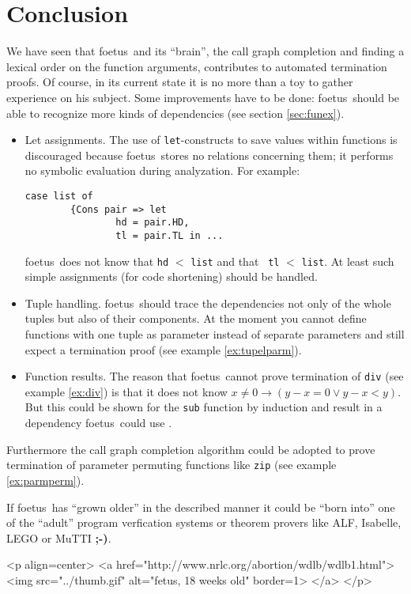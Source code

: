 \documentclass[12pt,a4paper]{article}
\newcommand{\foetus}{{\sf foetus}}
\newcommand{\less}{\boldsymbol{<}}%
\newcommand{\less}{`\!<\!'} %
\begin{document}
\section{Conclusion\label{sec:conclusion}}
We have seen that \foetus\ and its ``brain'', the call graph
completion and finding a lexical order on the function arguments,
contributes to automated termination proofs. Of course, in its current
state it is no more than a toy to gather experience on his
subject. Some improvements have to be done: \foetus\ should be able to
recognize more kinds of dependencies (see section \ref{sec:funex}).
\begin{itemize}
\item Let assignments. The use of {\tt let}-constructs to save
  values within functions is discouraged because \foetus\ stores no
  relations concerning them; it performs no symbolic evaluation during
  analyzation. For example:
\begin{verbatim}
case list of
        {Cons pair => let
                hd = pair.HD,
                tl = pair.TL in ...
\end{verbatim}
\foetus\ does not know that {\tt hd} $\less$ {\tt list} and that {\tt
  tl}  $\less$ {\tt list}. At least such simple assignments (for code
shortening) should be handled.
\item Tuple handling. \foetus\ should trace the dependencies not only
  of the whole tuples but also of their components. At the moment you
  cannot define functions with one tuple as parameter instead of
  separate parameters and still expect a termination proof (see
  example \ref{ex:tupelparm}).
\item Function results. The reason that \foetus\ cannot prove
  termination of {\tt div} (see example \ref{ex:div}) is that it does
  not know $x \not=0 \rightarrow (y-x=0 \lor y-x<y)$. But this could
  be shown for the {\tt sub} function by induction and result in a
  dependency \foetus\ could use \cite{BG96}.
\end{itemize}
Furthermore the call graph completion algorithm could be adopted to
prove termination of parameter permuting functions like {\tt zip} (see
example \ref{ex:parmperm}).

If \foetus\ has ``grown older'' in the described manner it could be
``born into'' one of the ``adult'' program verfication systems or
theorem provers like ALF, Isabelle, LEGO or MuTTI {\bf ;-)}.

\begin{rawhtml}
<p align=center>
<a href="http://www.nrlc.org/abortion/wdlb/wdlb1.html">
<img src="../thumb.gif" alt="fetus, 18 weeks old" border=1>
</a>
</p>
\end{rawhtml}

\nocite{Gie97}
\nocite{Sli96}
\nocite{Sli97a}
\nocite{NPS90}
\nocite{TTu97b}
\nocite{Pau91}



\end{document}
